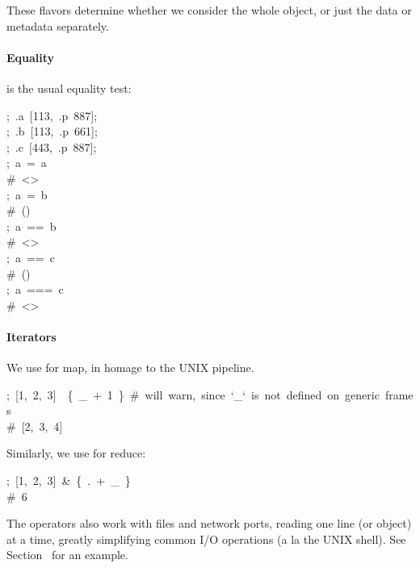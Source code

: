 \documentclass[preprint]{{acmart}}
\begin{document}
These flavors determine whether we consider the whole object, or just the data
or metadata separately.%

\paragraph{Equality}\label{sec-equality}%

\noindent{}\mdcode{=} is the usual equality test:%
\begin{mdpre}%
\noindent;~.a~{}[{113},~.p~{887}];\\
;~.b~{}[{113},~.p~{661}];\\
;~.c~{}[{443},~.p~{887}];\\
;~a~=~a\\
{\#~\textless{}\textgreater{}}\\
;~a~=~b\\
{\#~()}\\
;~a~==~b\\
{\#~\textless{}\textgreater{}}\\
;~a~==~c\\
{\#~()}\\
;~a~===~c\\
{\#~\textless{}\textgreater{}}%
\end{mdpre}
\paragraph{Iterators}\label{sec-iterators}%

\noindent{}We use \mdcode{\textbar{}} for map, in homage to the UNIX pipeline.%
\begin{mdpre}%
\noindent;~{}[1,~2,~3]~\textbar{}~\{~\_~+~1~\}~{\#~will~warn,~since~`\_`~is~not~defined~on~generic~frames}\\
{\#~{}[2,~3,~4]}%
\end{mdpre}\noindent{}Similarly, we use \mdcode{\&} for reduce:
\begin{mdpre}%
\noindent;~{}[1,~2,~3]~\&~\{~.~+~\_~\}\\
{\#~6}%
\end{mdpre}\noindent{}The operators also work with files and network ports, reading one line
(or object) at a time, greatly simplifying common I/O operations (a la
the UNIX shell). See Section~ for an example.
\end{document}
